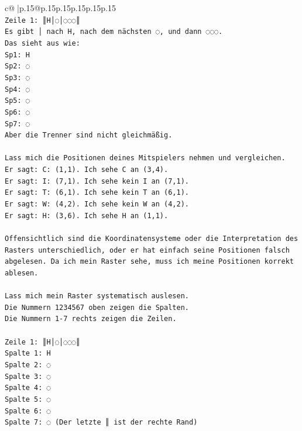 \documentclass{article}
\begin{document}
{\begin{supertabular}{c@{$\;$}|p{.15\linewidth}@{}p{.15\linewidth}p{.15\linewidth}p{.15\linewidth}p{.15\linewidth}p{.15\linewidth}}
{{{\\ 
\texttt{Zeile 1: ║H│◌│◌◌◌║} \\
\texttt{Es gibt │ nach H, nach dem nächsten ◌, und dann ◌◌◌.} \\
\texttt{Das sieht aus wie:} \\
\texttt{Sp1: H} \\
\texttt{Sp2: ◌} \\
\texttt{Sp3: ◌} \\
\texttt{Sp4: ◌} \\
\texttt{Sp5: ◌} \\
\texttt{Sp6: ◌} \\
\texttt{Sp7: ◌} \\
\texttt{Aber die Trenner sind nicht gleichmäßig.} \\
\\ 
\texttt{Lass mich die Positionen deines Mitspielers nehmen und vergleichen.} \\
\texttt{Er sagt: C: (1,1). Ich sehe C an (3,4).} \\
\texttt{Er sagt: I: (7,1). Ich sehe kein I an (7,1).} \\
\texttt{Er sagt: T: (6,1). Ich sehe kein T an (6,1).} \\
\texttt{Er sagt: W: (4,2). Ich sehe kein W an (4,2).} \\
\texttt{Er sagt: H: (3,6). Ich sehe H an (1,1).} \\
\\ 
\texttt{Offensichtlich sind die Koordinatensysteme oder die Interpretation des Rasters unterschiedlich, oder er hat einfach seine Positionen falsch abgelesen. Da ich mein Raster sehe, muss ich meine Positionen korrekt ablesen.} \\
\\ 
\texttt{Lass mich mein Raster systematisch auslesen.} \\
\texttt{Die Nummern 1234567 oben zeigen die Spalten.} \\
\texttt{Die Nummern 1{-}7 rechts zeigen die Zeilen.} \\
\\ 
\texttt{Zeile 1: ║H│◌│◌◌◌║} \\
\texttt{Spalte 1: H} \\
\texttt{Spalte 2: ◌} \\
\texttt{Spalte 3: ◌} \\
\texttt{Spalte 4: ◌} \\
\texttt{Spalte 5: ◌} \\
\texttt{Spalte 6: ◌} \\
\texttt{Spalte 7: ◌ (Der letzte ║ ist der rechte Rand)} \\
}}}
\end{supertabular}}
\end{document}

